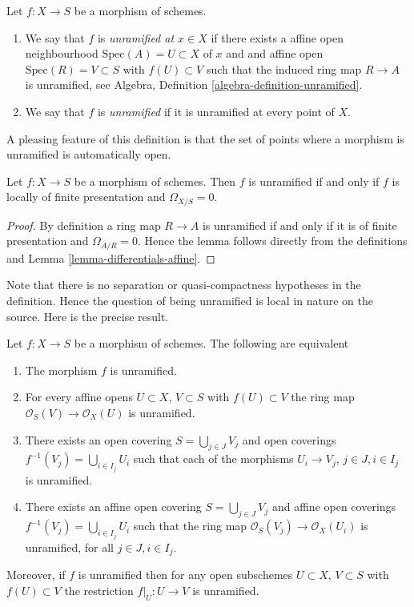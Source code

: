 \begin{definition}
\label{definition-unramified}
Let $f : X \to S$ be a morphism of schemes.
\begin{enumerate}
\item We say that $f$ is {\it unramified at $x \in X$} if
there exists a affine open neighbourhood $\text{Spec}(A) = U \subset X$
of $x$ and and affine open $\text{Spec}(R) = V \subset S$
with $f(U) \subset V$ such that the induced ring map
$R \to A$ is unramified, see
Algebra, Definition \ref{algebra-definition-unramified}.
\item We say that $f$ is {\it unramified} if it is unramified
at every point of $X$.
\end{enumerate}
\end{definition}

\noindent
A pleasing feature of this definition is that the set of points
where a morphism is unramified is automatically open.

\begin{lemma}
\label{lemma-unramified-omega-zero}
Let $f : X \to S$ be a morphism of schemes.
Then $f$ is unramified if and only if $f$ is locally of finite presentation
and $\Omega_{X/S} = 0$.
\end{lemma}

\begin{proof}
By definition a ring map $R \to A$ is unramified if and only if it is
of finite presentation and $\Omega_{A/R} = 0$. Hence the lemma follows
directly from the definitions and Lemma \ref{lemma-differentials-affine}.
\end{proof}

\medskip\noindent
Note that there is no separation or quasi-compactness hypotheses in the
definition. Hence the question of being unramified is local in nature on
the source. Here is the precise result.

\begin{lemma}
\label{lemma-unramified-characterize}
Let $f : X \to S$ be a morphism of schemes.
The following are equivalent
\begin{enumerate}
\item The morphism $f$ is unramified.
\item For every affine opens $U \subset X$, $V \subset S$
with $f(U) \subset V$ the ring map
$\mathcal{O}_S(V) \to \mathcal{O}_X(U)$ is unramified.
\item There exists an open covering $S = \bigcup_{j \in J} V_j$
and open coverings $f^{-1}(V_j) = \bigcup_{i \in I_j} U_i$ such
that each of the morphisms $U_i \to V_j$, $j\in J, i\in I_j$
is unramified.
\item There exists an affine open covering $S = \bigcup_{j \in J} V_j$
and affine open coverings $f^{-1}(V_j) = \bigcup_{i \in I_j} U_i$ such
that the ring map $\mathcal{O}_S(V_j) \to \mathcal{O}_X(U_i)$ is
unramified, for all $j\in J, i\in I_j$.
\end{enumerate}
Moreover, if $f$ is unramified then for
any open subschemes $U \subset X$, $V \subset S$ with $f(U) \subset V$
the restriction $f|_U : U \to V$ is unramified.
\end{lemma}

